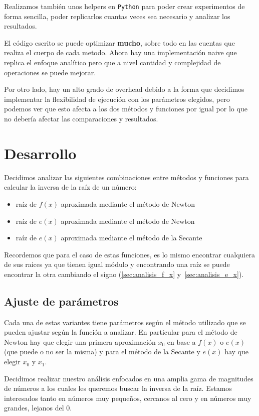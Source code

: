 Realizamos también unos helpers en \verb|Python| para poder crear experimentos
de forma sencilla, poder replicarlos cuantas veces sea necesario y analizar
los resultados.

El código escrito se puede optimizar \textbf{mucho}, sobre todo en las cuentas
que realiza el cuerpo de cada metodo. Ahora hay una implementación naive que
replica el enfoque analítico pero que a nivel cantidad y complejidad de
operaciones se puede mejorar.

Por otro lado, hay un alto grado de overhead debido a la forma que decidimos
implementar la flexibilidad de ejecución con los parámetros elegidos, pero
podemos ver que esto afecta a los dos métodos y funciones por igual por lo que
no debería afectar las comparaciones y resultados.

\newpage
\section{Desarrollo}

Decidimos analizar las siguientes combinaciones entre métodos y funciones para
calcular la inversa de la raíz de un número:

\begin{itemize}
    \item raíz de $f(x)$ aproximada mediante el método de Newton
    \item raíz de $e(x)$ aproximada mediante el método de Newton
    \item raíz de $e(x)$ aproximada mediante el método de la Secante
\end{itemize}

Recordemos que para el caso de estas funciones, es lo mismo encontrar
cualquiera de sus raices ya que tienen igual módulo y encontrando una raíz se
puede encontrar la otra cambiando el signo (\ref{sec:analisis_f_x}
y~\ref{sec:analisis_e_x}).

\subsection{Ajuste de parámetros}

Cada una de estas variantes tiene parámetros según el método utilizado que se
pueden ajustar según la función a analizar. En particular para el método de
Newton hay que elegir una primera aproximación $x_0$ en base a $f(x)$ o $e(x)$
(que puede o no ser la misma) y para el método de la Secante y $e(x)$ hay que
elegir $x_0$ y $x_1$.

Decidimos realizar nuestro análisis enfocados en una amplia gama de magnitudes
de números a los cuales les queremos buscar la inversa de la raíz. Estamos
interesados tanto en números muy pequeños, cercanos al cero y en números muy
grandes, lejanos del 0.

